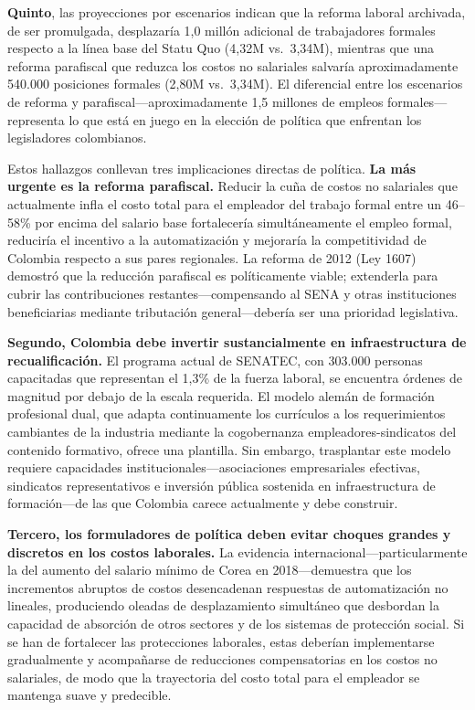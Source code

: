 \documentclass{article}
\begin{document}
\textbf{Quinto}, las proyecciones por escenarios indican que la reforma laboral archivada, de ser promulgada, desplazar\'ia 1,0 mill\'on adicional de trabajadores formales respecto a la l\'inea base del Statu Quo (4,32M vs.\ 3,34M), mientras que una reforma parafiscal que reduzca los costos no salariales salvar\'ia aproximadamente 540.000 posiciones formales (2,80M vs.\ 3,34M). El diferencial entre los escenarios de reforma y parafiscal---aproximadamente 1,5 millones de empleos formales---representa lo que est\'a en juego en la elecci\'on de pol\'itica que enfrentan los legisladores colombianos.

Estos hallazgos conllevan tres implicaciones directas de pol\'itica. \textbf{La m\'as urgente es la reforma parafiscal.} Reducir la cu\~na de costos no salariales que actualmente infla el costo total para el empleador del trabajo formal entre un 46--58\% por encima del salario base fortalecer\'ia simult\'aneamente el empleo formal, reducir\'ia el incentivo a la automatizaci\'on y mejorar\'ia la competitividad de Colombia respecto a sus pares regionales. La reforma de 2012 (Ley 1607) demostr\'o que la reducci\'on parafiscal es pol\'iticamente viable; extenderla para cubrir las contribuciones restantes---compensando al SENA y otras instituciones beneficiarias mediante tributaci\'on general---deber\'ia ser una prioridad legislativa.

\textbf{Segundo, Colombia debe invertir sustancialmente en infraestructura de recualificaci\'on.} El programa actual de SENATEC, con 303.000 personas capacitadas que representan el 1,3\% de la fuerza laboral, se encuentra \'ordenes de magnitud por debajo de la escala requerida. El modelo alem\'an de formaci\'on profesional dual, que adapta continuamente los curr\'iculos a los requerimientos cambiantes de la industria mediante la cogobernanza empleadores-sindicatos del contenido formativo, ofrece una plantilla. Sin embargo, trasplantar este modelo requiere capacidades institucionales---asociaciones empresariales efectivas, sindicatos representativos e inversi\'on p\'ublica sostenida en infraestructura de formaci\'on---de las que Colombia carece actualmente y debe construir.

\textbf{Tercero, los formuladores de pol\'itica deben evitar choques grandes y discretos en los costos laborales.} La evidencia internacional---particularmente la del aumento del salario m\'inimo de Corea en 2018---demuestra que los incrementos abruptos de costos desencadenan respuestas de automatizaci\'on no lineales, produciendo oleadas de desplazamiento simult\'aneo que desbordan la capacidad de absorci\'on de otros sectores y de los sistemas de protecci\'on social. Si se han de fortalecer las protecciones laborales, estas deber\'ian implementarse gradualmente y acompa\~narse de reducciones compensatorias en los costos no salariales, de modo que la trayectoria del costo total para el empleador se mantenga suave y predecible.
\end{document}

